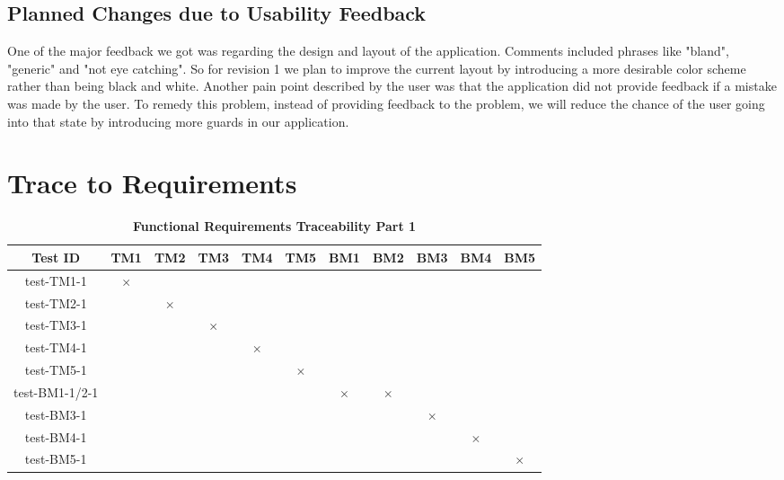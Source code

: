 \documentclass[12pt, titlepage]{article}
\begin{document}
\subsection{Planned Changes due to Usability Feedback}

One of the major feedback we got was regarding the design and layout of the application. Comments included phrases like "bland", "generic" and "not eye catching". So for revision 1 we plan to improve the current layout by introducing a more desirable color scheme rather than being black and white. Another pain point described by the user was that the application did not provide feedback if a mistake was made by the user. To remedy this problem, instead of providing feedback to the problem, we will reduce the chance of the user going into that state by introducing more guards in our application. 


\section{Trace to Requirements}

\begin{table}[H]
\centering
\begin{tabular}{|c|c|c|c|c|c|c|c|c|c|c|}
\hline
Test ID & TM1 & TM2 & TM3 & TM4 & TM5 & BM1 & BM2 & BM3 & BM4 & BM5 \\
\hline 
test-TM1-1 & $\times$ & & & & & & & & & \\
test-TM2-1 & & $\times$ & & & & & & & & \\
test-TM3-1 & & & $\times$ & & & & & & & \\
test-TM4-1 & & & & $\times$ & & & & & & \\
test-TM5-1 & & & & & $\times$ & & & & & \\
test-BM1-1/2-1 & & & & & & $\times$ & $\times$ & & & \\
test-BM3-1 & & & & & & & & $\times$ & & \\
test-BM4-1 & & & & & & & & & $\times$ & \\
test-BM5-1 & & & & & & & & & & $\times$ \\
\hline
\end{tabular}
\caption{\bf Functional Requirements Traceability Part 1}
\end{table}
\end{document}
